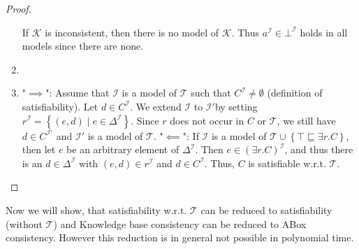 \begin{proof}
\begin{enumerate}
			If $\mathcal{K}$ is inconsistent, then there is no model of $\mathcal{K}$.
			Thus $a^{\mathcal{I}} \in \bot^\mathcal{I}$ holds in all models since there are none.
		\item
		\item "$ \implies$": \newline
			Assume that $\mathcal{I}$ is a model of $\mathcal{T}$ such that $C^\mathcal{I} \neq \emptyset$
			(definition of satisfiability).
			Let $d \in C^{\mathcal{I}}$.
			We extend $\mathcal{I}$ to $\mathcal{I}'$by setting $r^{\mathcal{I}} = \left\{ (e,d) \mid  e \in \Delta^{\mathcal{I}} \right\}$.
			Since $r$ does not occur in $C$ or $\mathcal{T}$, we still have $d \in C^\mathcal{I'}$ and $\mathcal{I'}$ is a model of $\mathcal{T}$. \newline
			"$\impliedby$": \newline
			If $\mathcal{I}$ is a model of $\mathcal{T} \cup \left\{ \top \sqsubseteq \exists r.C \right\}$,
			then let $e$ be an arbitrary element of $\Delta^{\mathcal{I}}$.
			Then $e \in \left( \exists r.C \right)^{\mathcal{I}}$, and thus there is an $d \in \Delta^{\mathcal{I}}$ 
			with $\left( e,d \right) \in r^{\mathcal{I}}$ and $d \in C^\mathcal{I}$.
			Thus, $C$ is satisfiable w.r.t. $\mathcal{T}$.
			\qedhere
	\end{enumerate}
\end{proof}

Now we will show, that satisfiability w.r.t. $\mathcal{T}$ can be reduced to satisfiability (without $\mathcal{T}$) and
Knowledge base consistency can be reduced to ABox consistency.
However this reduction is in general not possible in polynomial time.

